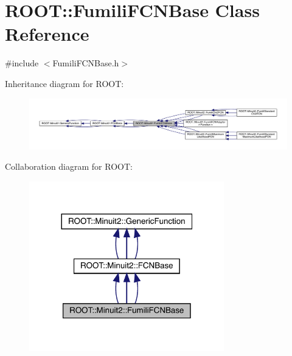 \hypertarget{classROOT_1_1Minuit2_1_1FumiliFCNBase}{}\section{R\+O\+OT\+:\+:Fumili\+F\+C\+N\+Base Class Reference}
\label{classROOT_1_1Minuit2_1_1FumiliFCNBase}


{\ttfamily \#include $<$Fumili\+F\+C\+N\+Base.\+h$>$}



Inheritance diagram for R\+O\+OT\+:
\nopagebreak
\begin{figure}[H]
\begin{center}
\leavevmode
\includegraphics[width=350pt]{de/d01/classROOT_1_1Minuit2_1_1FumiliFCNBase__inherit__graph}
\end{center}
\end{figure}


Collaboration diagram for R\+O\+OT\+:
\nopagebreak
\begin{figure}[H]
\begin{center}
\leavevmode
\includegraphics[width=240pt]{d3/d99/classROOT_1_1Minuit2_1_1FumiliFCNBase__coll__graph}
\end{center}
\end{figure}
